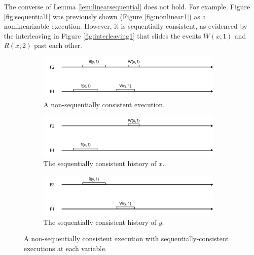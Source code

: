\documentclass[]             %
{NASA}                       %
\theoremstyle{definition}
\begin{document}
The converse of Lemma \ref{lem:linearsequential} does not hold. For
example, Figure \ref{fig:sequential1} was previously shown (Figure
\ref{fig:nonlinear1}) as a nonlinearizable execution. However, it is
sequentially consistent, as evidenced by the interleaving in Figure
\ref{fig:interleaving1} that slides the events \(W(x,1)\) and \(R(x,2)\)
past each other.

\begin{figure}
  \begin{subfigure}[a]{1\textwidth}
    \center
    \includegraphics[scale=0.4]{images/nonsequential1.png}
    \caption{A non-sequentially consistent execution.}
    \label{fig:nonsequential1}
  \end{subfigure}
  \begin{subfigure}[b]{1\textwidth}
    \center
    \includegraphics[scale=0.4]{images/nonsequential_x.png}
    \caption{The sequentially consistent history of $x$.}
    \label{fig:sequentialx}
  \end{subfigure}
  \begin{subfigure}[b]{1\textwidth}
    \center
    \includegraphics[scale=0.4]{images/nonsequential_y.png}
    \caption{The sequentially consistent history of $y$.}
    \label{fig:sequentialy}
  \end{subfigure}
  \caption{A non-sequentially consistent execution with sequentially-consistent executions at each variable.}
  \label{fig:nonsequential}
\end{figure}
\end{document}
